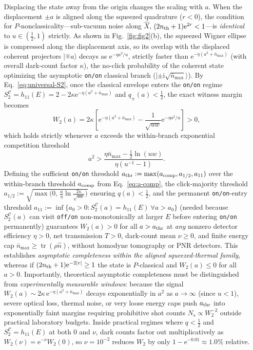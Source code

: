 \documentclass{iopjournal}
\newcommand{\tr}{\operatorname{tr}}
\newcommand{\Cset}{\mathcal{C}}
\newcommand{\nbar}{\bar n_{\max}}
\newcommand{\ket}[1]{\lvert #1\rangle}
\newcommand{\abs}[1]{\lvert #1\rvert}
\newcommand{\ii}{\mathrm{i}}
\newcommand{\ee}{\mathrm{e}}
\begin{document}
Displacing the state away from the origin changes the scaling with $a$. When the displacement $\pm a$ is aligned along the squeezed quadrature ($r < 0$), the condition for $P$-nonclassicality---sub-vacuum noise along $\hat X$, $(2n_{\rm th}+1)\ee^{2r} < 1$---is \emph{identical} to $u \in (\frac{1}{2}, 1)$ strictly. As shown in Fig.~\ref{fig:fig2}(b), the squeezed Wigner ellipse is compressed along the displacement axis, so its overlap with the displaced coherent projectors $\ket{\mp a}$ decays as $\ee^{-\eta a^2/u}$, strictly faster than $\ee^{-\eta(a^2+\nbar)}$ (with overall dark-count factor $\kappa$), the no-click probability of the coherent state optimizing the asymptotic \texttt{on/on} classical branch ($\ket{\pm\ii\sqrt{\nbar}}$). By Eq.~\eqref{eq:universal-S2}, once the classical envelope enters the \texttt{on/on} regime $S_2^{\Cset} = h_{11}(E) = 2 - 2\kappa\ee^{-\eta(a^2+\nbar)}$ and $q_\pm(a) < \frac{1}{2}$, the exact witness margin becomes
\begin{equation}\label{eq:W2-sq-exact}
W_2(a) = 2\kappa\left[\ee^{-\eta(a^2+\nbar)} - \frac{1}{\sqrt{uw}}\ee^{-\eta a^2/u}\right] > 0,
\end{equation}
which holds strictly whenever $a$ exceeds the within-branch exponential competition threshold
\begin{equation}\label{eq:a-comp}
a^2 > \frac{\eta\nbar - \frac{1}{2}\ln(uw)}{\eta(u^{-1} - 1)}.
\end{equation}
Defining the sufficient \texttt{on/on} threshold $a_{\rm thr} := \max(a_{\rm comp}, a_{1/2}, a_{11})$ over the within-branch threshold $a_{\rm comp}$ from Eq.~\eqref{eq:a-comp}, the click-majority threshold $a_{1/2} := \sqrt{\max\bigl(0,\, \frac{u}{\eta}\ln\frac{2\kappa}{\sqrt{uw}}\bigr)}$ ensuring $q(a) < \frac{1}{2}$, and the permanent \texttt{on/on}-entry threshold $a_{11} := \inf\{a_0 > 0 : S_2^{\Cset}(a) = h_{11}(E)\ \forall a > a_0\}$ (needed because $S_2^{\Cset}(a)$ can visit \texttt{off/on} non-monotonically at larger $E$ before entering \texttt{on/on} permanently) guarantees $W_2(a) > 0$ for all $a > a_{\rm thr}$ at \emph{any} nonzero detector efficiency $\eta > 0$, net transmission $T > 0$, dark-count mean $\nu \ge 0$, and finite energy cap $\nbar \ge \tr(\rho\hat n)$, without homodyne tomography or PNR detectors. This establishes \emph{asymptotic completeness within the aligned squeezed-thermal family}, whereas if $(2n_{\rm th}+1)\ee^{-2\abs{r}} \ge 1$ the state is $P$-classical and $W_2(a) \le 0$ for all $a > 0$. Importantly, theoretical asymptotic completeness must be distinguished from \emph{experimentally measurable windows}: because the signal $W_2(a) \sim 2\kappa\,\ee^{-\eta(a^2+\nbar)}$ decays exponentially in $a^2$ as $a \to \infty$ (since $u < 1$), severe optical loss, thermal noise, or very loose energy caps push $a_{\rm thr}$ into exponentially faint margins requiring prohibitive shot counts $N_s \propto W_2^{-2}$ outside practical laboratory budgets. Inside practical regimes where $q < \frac{1}{2}$ and $S_2^{\Cset} = h_{11}(E)$ at both $0$ and $\nu$, dark counts factor out multiplicatively as $W_2(\nu) = \ee^{-\nu}W_2(0)$, so $\nu = 10^{-2}$ reduces $W_2$ by only $1 - \ee^{-0.01} \approx 1.0\%$ relative.
\end{document}
